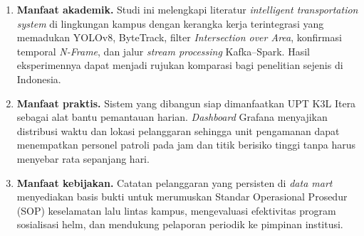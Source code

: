 \begin{enumerate}
  \item \textbf{Manfaat akademik.} Studi ini melengkapi literatur \textit{intelligent transportation system} di lingkungan kampus dengan kerangka kerja terintegrasi yang memadukan YOLOv8, ByteTrack, filter \textit{Intersection over Area}, konfirmasi temporal \textit{N-Frame}, dan jalur \textit{stream processing} Kafka--Spark. Hasil eksperimennya dapat menjadi rujukan komparasi bagi penelitian sejenis di Indonesia.

  \item \textbf{Manfaat praktis.} Sistem yang dibangun siap dimanfaatkan UPT K3L Itera sebagai alat bantu pemantauan harian. \textit{Dashboard} Grafana menyajikan distribusi waktu dan lokasi pelanggaran sehingga unit pengamanan dapat menempatkan personel patroli pada jam dan titik berisiko tinggi tanpa harus menyebar rata sepanjang hari.

  \item \textbf{Manfaat kebijakan.} Catatan pelanggaran yang persisten di \textit{data mart} menyediakan basis bukti untuk merumuskan Standar Operasional Prosedur (SOP) keselamatan lalu lintas kampus, mengevaluasi efektivitas program sosialisasi helm, dan mendukung pelaporan periodik ke pimpinan institusi.
\end{enumerate}

